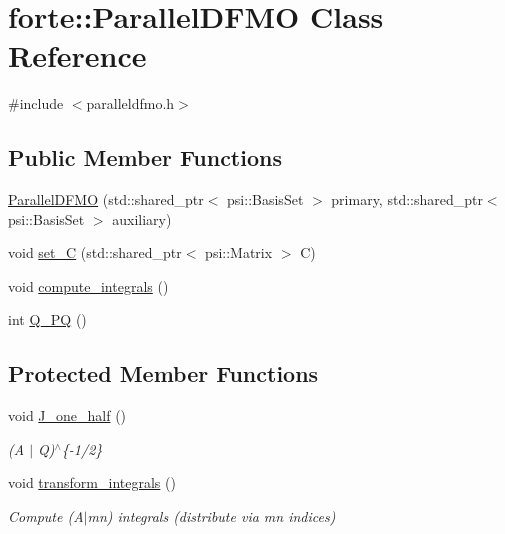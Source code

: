 \hypertarget{classforte_1_1_parallel_d_f_m_o}{}\section{forte\+:\+:Parallel\+D\+F\+MO Class Reference}
\label{classforte_1_1_parallel_d_f_m_o}


{\ttfamily \#include $<$paralleldfmo.\+h$>$}

\subsection*{Public Member Functions}
\begin{DoxyCompactItemize}
\item 
\mbox{\hyperlink{classforte_1_1_parallel_d_f_m_o_a647bad30b94da4ab861517eb7fe2fbb9}{Parallel\+D\+F\+MO}} (std\+::shared\+\_\+ptr$<$ psi\+::\+Basis\+Set $>$ primary, std\+::shared\+\_\+ptr$<$ psi\+::\+Basis\+Set $>$ auxiliary)
\item 
void \mbox{\hyperlink{classforte_1_1_parallel_d_f_m_o_abba809ee0432d7fa6432d87b5dda5164}{set\+\_\+C}} (std\+::shared\+\_\+ptr$<$ psi\+::\+Matrix $>$ C)
\item 
void \mbox{\hyperlink{classforte_1_1_parallel_d_f_m_o_a30e08d02f18b1015ce306228aab04ec3}{compute\+\_\+integrals}} ()
\item 
int \mbox{\hyperlink{classforte_1_1_parallel_d_f_m_o_ad565d4270690471f1c6777c245b4917b}{Q\+\_\+\+PQ}} ()
\end{DoxyCompactItemize}
\subsection*{Protected Member Functions}
\begin{DoxyCompactItemize}
\item 
void \mbox{\hyperlink{classforte_1_1_parallel_d_f_m_o_a629322edbef4052935334ae9a5171da9}{J\+\_\+one\+\_\+half}} ()
\begin{DoxyCompactList}\small\item\em (A $\vert$ Q)$^\wedge$\{-\/1/2\} \end{DoxyCompactList}\item 
void \mbox{\hyperlink{classforte_1_1_parallel_d_f_m_o_a61aa38462ee04b1c9fa0539a65008f22}{transform\+\_\+integrals}} ()
\begin{DoxyCompactList}\small\item\em Compute (A$\vert$mn) integrals (distribute via mn indices) \end{DoxyCompactList}\end{DoxyCompactItemize}
